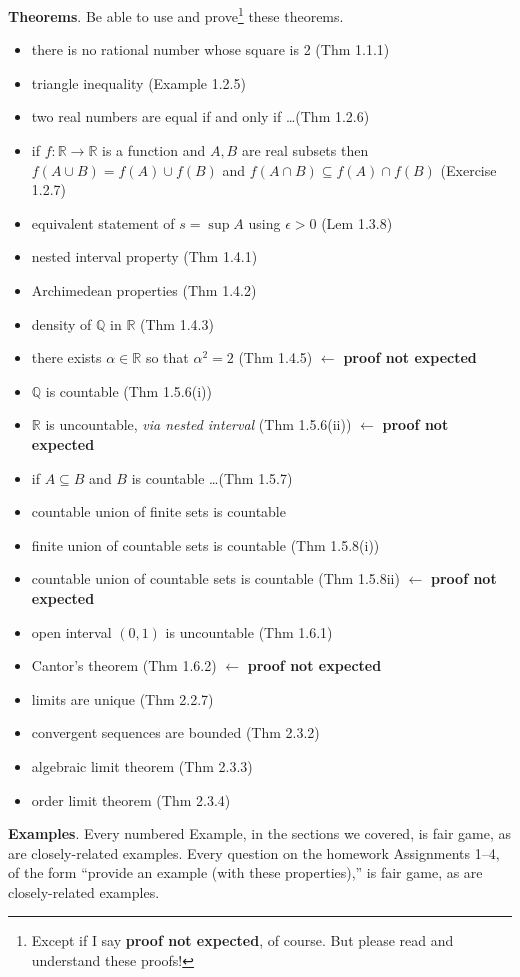 \documentclass[12pt]{amsart}
\newcommand{\QQ}{{\mathbb{Q}}}
\newcommand{\RR}{{\mathbb{R}}}
\newcommand{\eps}{\epsilon}
\begin{document}
\newcommand{\pne}{\hfill {\footnotesize $\leftarrow$ \textbf{proof not expected}}}
\noindent \textbf{Theorems}.  Be able to use and prove\footnote{Except if I say \textbf{proof not expected}, of course.  But please read and understand these proofs!} these theorems.
\begin{itemize}
\item there is no rational number whose square is 2 (Thm 1.1.1)
\item triangle inequality (Example 1.2.5)
\item two real numbers are equal if and only if \dots (Thm 1.2.6)
\item if $f:\RR\to\RR$ is a function and $A,B$ are real subsets then $f(A\cup B) = f(A) \cup f(B)$ and $f(A\cap B) \subseteq f(A) \cap f(B)$ (Exercise 1.2.7)
\item equivalent statement of $s=\sup A$ using $\eps>0$ (Lem 1.3.8)
\item nested interval property (Thm 1.4.1)
\item Archimedean properties (Thm 1.4.2)
\item density of $\QQ$ in $\RR$ (Thm 1.4.3)
\item there exists $\alpha\in\RR$ so that $\alpha^2=2$ (Thm 1.4.5) \pne
\item $\QQ$ is countable (Thm 1.5.6(i))
\item $\RR$ is uncountable, \emph{via nested interval} (Thm 1.5.6(ii)) \pne
\item if $A\subseteq B$ and $B$ is countable \dots (Thm 1.5.7)
\item countable union of finite sets is countable
\item finite union of countable sets is countable (Thm 1.5.8(i))
\item countable union of countable sets is countable (Thm 1.5.8ii) \pne
\item open interval $(0,1)$ is uncountable (Thm 1.6.1)
\item Cantor's theorem (Thm 1.6.2) \pne
\item limits are unique (Thm 2.2.7)
\item convergent sequences are bounded (Thm 2.3.2)
\item algebraic limit theorem (Thm 2.3.3)
\item order limit theorem (Thm 2.3.4)
\end{itemize}


\bigskip
\noindent \textbf{Examples}.  Every numbered Example, in the sections we covered, is fair game, as are closely-related examples.  Every question on the homework Assignments 1--4, of the form ``provide an example (with these properties),'' is fair game, as are closely-related examples.

\vfill
\end{document}
